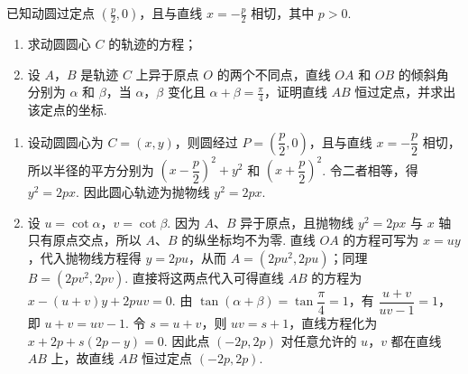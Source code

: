 \begin{problem}
已知动圆过定点 \(\left(\frac{p}{2}, 0\right)\)，且与直线 \(x = -\frac{p}{2}\) 相切，其中 \(p > 0\).

\begin{enumerate}
\item 求动圆圆心 \(C\) 的轨迹的方程；
\item 设 \(A\)，\(B\) 是轨迹 \(C\) 上异于原点 \(O\) 的两个不同点，直线 \(OA\) 和 \(OB\) 的倾斜角分别为 \(\alpha\) 和 \(\beta\)，当 \(\alpha\)，\(\beta\) 变化且 \(\alpha + \beta = \frac\pi4\)，证明直线 \(AB\) 恒过定点，并求出该定点的坐标.
\end{enumerate}
\end{problem}

\begin{solution}
\begin{enumerate}
\item 设动圆圆心为 \(C=(x,y)\)，则圆经过 \(P=\left(\dfrac p2,0\right)\)，且与直线 \(x=-\dfrac p2\) 相切，所以半径的平方分别为
\(\left(x-\dfrac p2\right)^2+y^2\) 和 \(\left(x+\dfrac p2\right)^2\). 令二者相等，得 \(y^2=2px\). 因此圆心轨迹为抛物线 \(y^2=2px\).
\item 设 \(u=\cot\alpha\)，\(v=\cot\beta\). 因为 \(A\)、\(B\) 异于原点，且抛物线 \(y^2=2px\) 与 \(x\) 轴只有原点交点，所以 \(A\)、\(B\) 的纵坐标均不为零. 直线 \(OA\) 的方程可写为 \(x=uy\)，代入抛物线方程得 \(y=2pu\)，从而 \(A=(2pu^2,2pu)\)；同理 \(B=(2pv^2,2pv)\). 直接将这两点代入可得直线 \(AB\) 的方程为
\(x-(u+v)y+2puv=0\). 由 \(\tan(\alpha+\beta)=\tan\dfrac\pi4=1\)，有
\(\dfrac{u+v}{uv-1}=1\)，即 \(u+v=uv-1\). 令 \(s=u+v\)，则 \(uv=s+1\)，直线方程化为
\(x+2p+s(2p-y)=0\). 因此点 \((-2p,2p)\) 对任意允许的 \(u\)，\(v\) 都在直线 \(AB\) 上，故直线 \(AB\) 恒过定点 \((-2p,2p)\).
\end{enumerate}
\end{solution}
